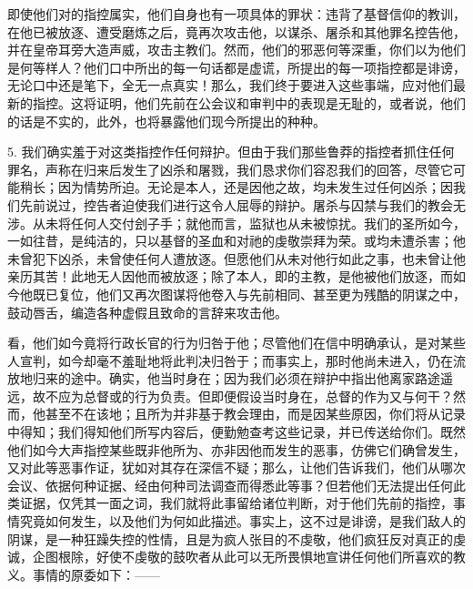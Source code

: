 即使他们对的指控属实，他们自身也有一项具体的罪状：违背了基督信仰的教训，在他已被放逐、遭受磨炼之后，竟再次攻击他，以谋杀、屠杀和其他罪名控告他，并在皇帝耳旁大造声威，攻击主教们。然而，他们的邪恶何等深重，你们以为他们是何等样人？他们口中所出的每一句话都是虚谎，所提出的每一项指控都是诽谤，无论口中还是笔下，全无一点真实！那么，我们终于要进入这些事端，应对他们最新的指控。这将证明，他们先前在公会议和审判中的表现是无耻的，或者说，他们的话是不实的，此外，也将暴露他们现今所提出的种种。\par

5. 我们确实羞于对这类指控作任何辩护。但由于我们那些鲁莽的指控者抓住任何罪名，声称在归来后发生了凶杀和屠戮，我们恳求你们容忍我们的回答，尽管它可能稍长；因为情势所迫。无论是本人，还是因他之故，均未发生过任何凶杀；因我们先前说过，控告者迫使我们进行这令人屈辱的辩护。屠杀与囚禁与我们的教会无涉。从未将任何人交付刽子手；就他而言，监狱也从未被惊扰。我们的圣所如今，一如往昔，是纯洁的，只以基督的圣血和对祂的虔敬崇拜为荣。或均未遭杀害；他未曾犯下凶杀，未曾使任何人遭放逐。但愿他们从未对他行如此之事，也未曾让他亲历其苦！此地无人因他而被放逐；除了本人，即的主教，是他被他们放逐，而如今他既已复位，他们又再次图谋将他卷入与先前相同、甚至更为残酷的阴谋之中，鼓动唇舌，编造各种虚假且致命的言辞来攻击他。\par

看，他们如今竟将行政长官的行为归咎于他；尽管他们在信中明确承认，是对某些人宣判，如今却毫不羞耻地将此判决归咎于；而事实上，那时他尚未进入，仍在流放地归来的途中。确实，他当时身在；因为我们必须在辩护中指出他离家路途遥远，故不应为总督或的行为负责。但即便假设当时身在，总督的作为又与何干？然而，他甚至不在该地；且所为并非基于教会理由，而是因某些原因，你们将从记录中得知；我们得知他们所写内容后，便勤勉查考这些记录，并已传送给你们。既然他们如今大声指控某些既非他所为、亦非因他而发生的恶事，仿佛它们确曾发生，又对此等恶事作证，犹如对其存在深信不疑；那么，让他们告诉我们，他们从哪次会议、依据何种证据、经由何种司法调查而得悉此等事？但若他们无法提出任何此类证据，仅凭其一面之词，我们就将此事留给诸位判断，对于他们先前的指控，事情究竟如何发生，以及他们为何如此描述。事实上，这不过是诽谤，是我们敌人的阴谋，是一种狂躁失控的性情，且是为疯人张目的不虔敬，他们疯狂反对真正的虔诚，企图根除，好使不虔敬的鼓吹者从此可以无所畏惧地宣讲任何他们所喜欢的教义。事情的原委如下：——\par

